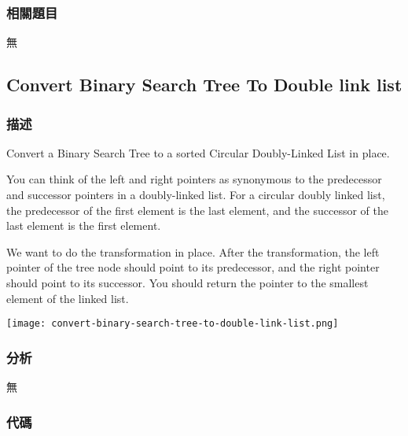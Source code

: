 \subsubsection{相關題目}
\begindot
\item 無
\myenddot

\subsection{Convert Binary Search Tree To Double link list} %
\label{sec:convert-binary-search-tree-to-double-link-list}


\subsubsection{描述}
Convert a Binary Search Tree to a sorted Circular Doubly-Linked List in place.

You can think of the left and right pointers as synonymous to the predecessor and successor pointers in a doubly-linked list. For a circular doubly linked list, the predecessor of the first element is the last element, and the successor of the last element is the first element.

We want to do the transformation in place. After the transformation, the left pointer of the tree node should point to its predecessor, and the right pointer should point to its successor. You should return the pointer to the smallest element of the linked list.


\begin{center}
\texttt{[image: convert-binary-search-tree-to-double-link-list.png]}\\
\label{fig:convert-binary-search-tree-to-double-link-list}
\end{center}
\subsubsection{分析}
無

\subsubsection{代碼}

